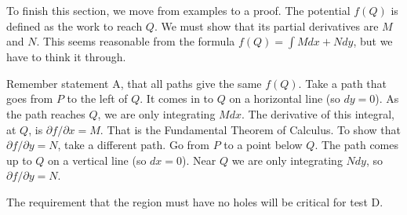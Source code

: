 {To finish this section, we move from examples to a proof. The potential $f(Q)$ is
defined as the work to reach $Q$. We must show that its partial derivatives are $M$ and
$N$. This seems reasonable from the formula $f (Q) = \int M dx + N dy$, but we have to
think it through.

Remember statement A, that all paths give the same $f(Q)$. Take a path that goes
from $P$ to the left of $Q$. It comes in to $Q$ on a horizontal line (so $dy = 0$). As the
path reaches $Q$, we are only integrating $M dx$. The derivative of this integral, at $Q$, is
$\partial f/\partial x = M$. That is the Fundamental Theorem of Calculus.
To show that $\partial f/\partial y= N$, take a different path. Go from $P$ to a point below $Q$. The
path comes up to $Q$ on a vertical line (so $dx = 0$). Near $Q$ we are only integrating
$N dy$, so $\partial f/\partial y= N$.

The requirement that the region must have no holes will be critical for test D.


}
